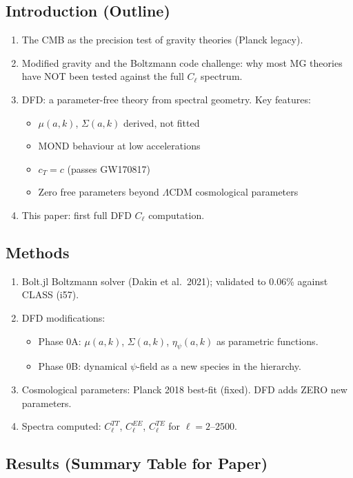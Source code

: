 \documentclass[11pt,a4paper]{article}
\begin{document}
\subsection{Introduction (Outline)}

\begin{enumerate}
\item The CMB as the precision test of gravity theories (Planck legacy).
\item Modified gravity and the Boltzmann code challenge: why most MG theories have NOT been tested against the full $C_\ell$ spectrum.
\item DFD: a parameter-free theory from spectral geometry. Key features:
\begin{itemize}
\item $\mu(a,k)$, $\Sigma(a,k)$ derived, not fitted
\item MOND behaviour at low accelerations
\item $c_T = c$ (passes GW170817)
\item Zero free parameters beyond $\Lambda$CDM cosmological parameters
\end{itemize}
\item This paper: first full DFD $C_\ell$ computation.
\end{enumerate}

\subsection{Methods}

\begin{enumerate}
\item Bolt.jl Boltzmann solver (Dakin et al.\ 2021); validated to 0.06\% against CLASS (i57).
\item DFD modifications:
\begin{itemize}
\item Phase 0A: $\mu(a,k)$, $\Sigma(a,k)$, $\eta_\psi(a,k)$ as parametric functions.
\item Phase 0B: dynamical $\psi$-field as a new species in the hierarchy.
\end{itemize}
\item Cosmological parameters: Planck 2018 best-fit (fixed). DFD adds ZERO new parameters.
\item Spectra computed: $C_\ell^{TT}$, $C_\ell^{EE}$, $C_\ell^{TE}$ for $\ell = 2$--$2500$.
\end{enumerate}

\subsection{Results (Summary Table for Paper)}
\end{document}
